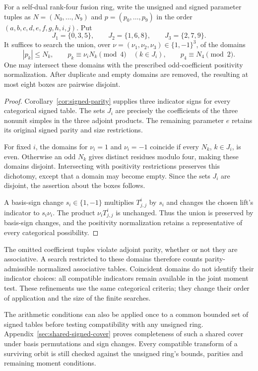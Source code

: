 \begin{corollary}
\label{cor:parity-restricted-enumeration}
For a self-dual rank-four fusion ring, write the unsigned and signed
parameter tuples as $N=(N_0,\ldots,N_9)$ and $p=(p_0,\ldots,p_9)$
in the order $(a,b,c,d,e,f,g,h,i,j)$. Put
\[
 J_1=\{0,3,5\},\qquad J_2=\{1,6,8\},\qquad
 J_3=\{2,7,9\}.
\]
It suffices to search the union, over
$\nu=(\nu_1,\nu_2,\nu_3)\in\{1,-1\}^3$, of the domains
\[
 |p_k|\leq N_k,\qquad
 p_k\equiv\nu_iN_k\pmod4\quad(k\in J_i),\qquad
 p_4\equiv N_4\pmod2.
\]
One may intersect these domains with the prescribed odd-coefficient
positivity normalization. After duplicate and empty domains are
removed, the resulting at most eight boxes are pairwise disjoint.
\end{corollary}
\begin{proof}
Corollary~\ref{cor:signed-parity} supplies three indicator signs
for every categorical signed table. The sets $J_i$ are precisely
the coefficients of the three nonunit simples in the three adjoint
products. The remaining parameter $e$ retains its original signed
parity and size restrictions.

For fixed $i$, the domains for $\nu_i=1$ and $\nu_i=-1$
coincide if every $N_k$, $k\in J_i$, is even. Otherwise an odd
$N_k$ gives distinct residues modulo four, making these domains
disjoint. Intersecting with positivity restrictions preserves this
dichotomy, except that a domain may become empty. Since the sets
$J_i$ are disjoint, the assertion about the boxes follows.

A basis-sign change $s_i\in\{1,-1\}$ multiplies $T_{j,j}^{i}$
by $s_i$ and changes the chosen lift's indicator to $s_i\nu_i$.
The product $\nu_iT_{j,j}^{i}$ is unchanged. Thus the union is
preserved by basis-sign changes, and the positivity normalization
retains a representative of every categorical possibility.
\end{proof}
The omitted coefficient tuples violate adjoint parity, whether or not
they are associative. A search restricted to these domains therefore
counts parity-admissible normalized associative tables. Coincident
domains do not identify their indicator choices: all compatible
indicators remain available in the joint moment test. These refinements
use the same categorical criteria; they change their order of application
and the size of the finite searches.

The arithmetic conditions can also be applied once to a common bounded
set of signed tables before testing compatibility with any unsigned
ring. Appendix~\ref{sec:shared-signed-cover} proves completeness of
such a shared cover under basis permutations and sign changes. Every
compatible transform of a surviving orbit is still checked against
the unsigned ring's bounds, parities and remaining moment conditions.
